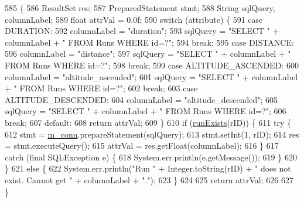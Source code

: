 \begin{DoxyCode}
585                                                                                    \{
586         ResultSet res;
587         PreparedStatement stmt;
588         String sqlQuery, columnLabel;
589         \textcolor{keywordtype}{float} attrVal = 0.0f;
590         \textcolor{keywordflow}{switch} (attribute) \{
591             \textcolor{keywordflow}{case} DURATION:
592                 columnLabel = \textcolor{stringliteral}{"duration"};
593                 sqlQuery = \textcolor{stringliteral}{"SELECT "} + columnLabel + \textcolor{stringliteral}{" FROM Runs WHERE id=?"};
594                 \textcolor{keywordflow}{break};
595             \textcolor{keywordflow}{case} DISTANCE:
596                 columnLabel = \textcolor{stringliteral}{"distance"};
597                 sqlQuery = \textcolor{stringliteral}{"SELECT "} + columnLabel + \textcolor{stringliteral}{" FROM Runs WHERE id=?"};
598                 \textcolor{keywordflow}{break};
599             \textcolor{keywordflow}{case} ALTITUDE\_ASCENDED:
600                 columnLabel = \textcolor{stringliteral}{"altitude\_ascended"};
601                 sqlQuery = \textcolor{stringliteral}{"SELECT "} + columnLabel + \textcolor{stringliteral}{" FROM Runs WHERE id=?"};
602                 \textcolor{keywordflow}{break};
603             \textcolor{keywordflow}{case} ALTITUDE\_DESCENDED:
604                 columnLabel = \textcolor{stringliteral}{"altitude\_descended"};
605                 sqlQuery = \textcolor{stringliteral}{"SELECT "} + columnLabel + \textcolor{stringliteral}{" FROM Runs WHERE id=?"};
606                 \textcolor{keywordflow}{break};
607             \textcolor{keywordflow}{default}:
608                 \textcolor{keywordflow}{return} attrVal;
609         \}
610         \textcolor{keywordflow}{if} (\hyperlink{classcom_1_1activitytracker_1_1_d_b_manager_a723ac1c573bacdd0b62894357bd65a9b}{runExists}(rID)) \{
611             \textcolor{keywordflow}{try} \{
612                 stmt = \hyperlink{classcom_1_1activitytracker_1_1_d_b_manager_a064088d13ac09eb147fdc19268771521}{m\_conn}.prepareStatement(sqlQuery);
613                 stmt.setInt(1, rID);
614                 res = stmt.executeQuery();
615                 attrVal = res.getFloat(columnLabel);
616             \}
617             \textcolor{keywordflow}{catch} (\textcolor{keyword}{final} SQLException e) \{
618                 System.err.println(e.getMessage());
619             \}
620         \}
621         \textcolor{keywordflow}{else} \{
622             System.err.println(\textcolor{stringliteral}{"Run "} + Integer.toString(rID) + \textcolor{stringliteral}{" does not exist. Cannot get "} + 
      columnLabel + \textcolor{stringliteral}{"."});
623         \}
624 
625         \textcolor{keywordflow}{return} attrVal;
626 
627     \}
\end{DoxyCode}
